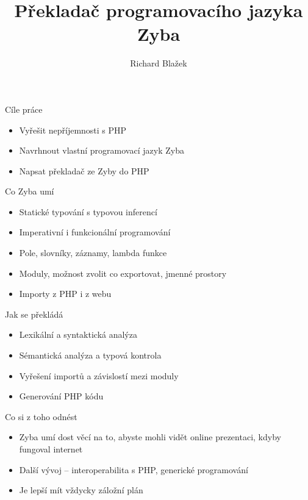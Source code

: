 \documentclass{beamer}
\date{}
\title{Překladač programovacího jazyka Zyba}
\author{Richard Blažek}
\begin{document}
\begin{frame}
\titlepage
\end{frame}
\begin{frame}{Cíle práce}
\begin{itemize}
    \item Vyřešit nepříjemnosti s PHP
    \item Navrhnout vlastní programovací jazyk Zyba
    \item Napsat překladač ze Zyby do PHP
\end{itemize}
\end{frame}
\begin{frame}{Co Zyba umí}
\begin{itemize}
    \item Statické typování s typovou inferencí
    \item Imperativní i funkcionální programování
    \item Pole, slovníky, záznamy, lambda funkce
    \item Moduly, možnost zvolit co exportovat, jmenné prostory
    \item Importy z PHP i z webu
\end{itemize}
\end{frame}
\begin{frame}{Jak se překládá}
\begin{itemize}
    \item Lexikální a syntaktická analýza
    \item Sémantická analýza a typová kontrola
    \item Vyřešení importů a závislostí mezi moduly
    \item Generování PHP kódu
\end{itemize}
\end{frame}
\begin{frame}{Co si z toho odnést}
\begin{itemize}
    \item Zyba umí dost věcí na to, abyste mohli vidět online prezentaci, kdyby fungoval internet
    \item Další vývoj -- interoperabilita s PHP, generické programování
    \item Je lepší mít vždycky záložní plán
\end{itemize}
\end{frame}
\end{document}
